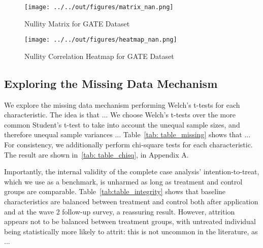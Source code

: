 

\begin{figure}
    \caption{Nullity Matrix for GATE Dataset}
    \texttt{[image: ../../out/figures/matrix\_nan.png]}
    \label{fig:matrix_nan}
\end{figure}

\begin{figure}
    \caption{Nullity Correlation Heatmap for GATE Dataset}
    \texttt{[image: ../../out/figures/heatmap\_nan.png]}
    \label{fig:heatmap_nan}
\end{figure}




\subsection{Exploring the Missing Data Mechanism}

We explore the missing data mechanism performing Welch's t-tests for each characteristic. The idea is that ...
We choose Welch's t-tests over the more common Student's t-test to take into account the unequal sample sizes, and therefore unequal sample variances ... %
Table~\ref{tab: table_missing} shows that ...
For consistency, we additionally perform chi-square tests for each characteristic. The result are shown in~\ref{tab: table_chisq}, in Appendix A. %

Importantly, the internal validity of the complete case analysis' intention-to-treat, which we use as a benchmark, is unharmed as long as treatment and control groups are comparable. Table~\ref{tab:table_integrity} shows that baseline characteristics are balanced between treatment and control both after application and at the wave 2 follow-up survey, a reassuring result. However, attrition appears not to be balanced between treatment groups, with untreated individual being statistically more likely to attrit: this is not uncommon in the literature, as ... %

